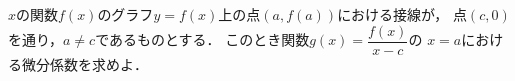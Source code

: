 \documentclass[../../main.tex]{subfiles}
\begin{document}
$x$の関数$f(x)$のグラフ$y=f(x)$上の点$(a,f(a))$における接線が，
点$(c,0)$を通り，$a \neq c$であるものとする．
このとき関数$\displaystyle g(x)=\dfrac{f(x)}{x-c}$の
$x=a$における微分係数を求めよ．
\end{document}
